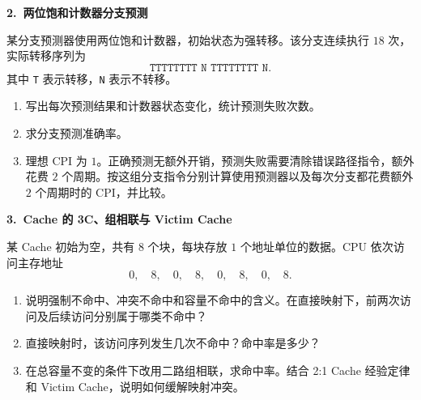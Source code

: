 \documentclass[zihao=-4,a4paper,fontset=windows]{ctexart}
\begin{document}
\noindent\textbf{2.\ 两位饱和计数器分支预测}\par
某分支预测器使用两位饱和计数器，初始状态为强转移。该分支连续执行 $18$ 次，实际转移序列为
\[
\texttt{TTTTTTTT N TTTTTTTT N}.
\]
其中 \texttt{T} 表示转移，\texttt{N} 表示不转移。
\begin{enumerate}[label=(\arabic*)]
\item 写出每次预测结果和计数器状态变化，统计预测失败次数。
\item 求分支预测准确率。
\item 理想 CPI 为 $1$。正确预测无额外开销，预测失败需要清除错误路径指令，额外花费 $2$ 个周期。按这组分支指令分别计算使用预测器以及每次分支都花费额外 $2$ 个周期时的 CPI，并比较。
\end{enumerate}

\noindent\textbf{3.\ Cache 的 3C、组相联与 Victim Cache}\par
某 Cache 初始为空，共有 $8$ 个块，每块存放 $1$ 个地址单位的数据。CPU 依次访问主存地址
\[
0,\quad8,\quad0,\quad8,\quad0,\quad8,\quad0,\quad8.
\]
\begin{enumerate}[label=(\arabic*)]
\item 说明强制不命中、冲突不命中和容量不命中的含义。在直接映射下，前两次访问及后续访问分别属于哪类不命中？
\item 直接映射时，该访问序列发生几次不命中？命中率是多少？
\item 在总容量不变的条件下改用二路组相联，求命中率。结合 2:1 Cache 经验定律和 Victim Cache，说明如何缓解映射冲突。
\end{enumerate}


\fi
\end{document}
